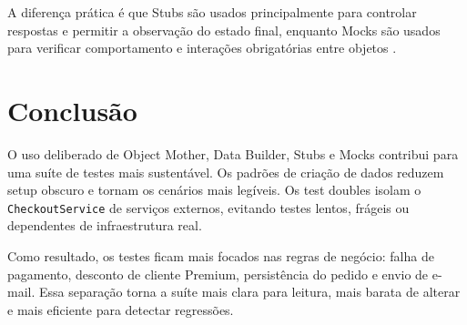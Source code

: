 \documentclass[
    12pt,
    openright,
    oneside,
    a4paper,
    chapter=TITLE,
    section=TITLE,
    brazil,
]{abntex2}
\begin{document}
A diferen\c{c}a pr\'atica \'e que Stubs s\~ao usados principalmente para controlar respostas e permitir a observa\c{c}\~ao do estado final, enquanto Mocks s\~ao usados para verificar comportamento e intera\c{c}\~oes obrigat\'orias entre objetos \cite{fowlerMocks}.

\chapter{Conclus\~ao}

O uso deliberado de Object Mother, Data Builder, Stubs e Mocks contribui para uma su\'ite de testes mais sustent\'avel. Os padr\~oes de cria\c{c}\~ao de dados reduzem setup obscuro e tornam os cen\'arios mais leg\'iveis. Os test doubles isolam o \texttt{CheckoutService} de servi\c{c}os externos, evitando testes lentos, fr\'ageis ou dependentes de infraestrutura real.

Como resultado, os testes ficam mais focados nas regras de neg\'ocio: falha de pagamento, desconto de cliente Premium, persist\^encia do pedido e envio de e-mail. Essa separa\c{c}\~ao torna a su\'ite mais clara para leitura, mais barata de alterar e mais eficiente para detectar regress\~oes.

\postextual


\end{document}
